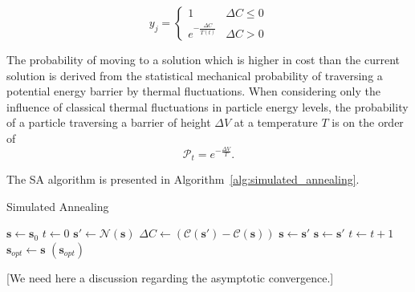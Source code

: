 \documentclass[11pt]{afthesis}
\begin{document}
	\begin{equation} 
	y_j = \begin{cases}
	1 &\Delta C   \leq 0 \\
	e^{-\frac{\Delta C}{T(t)}} & \Delta C > 0 
	\end{cases}
	\end{equation}

	
	The probability of moving to a solution which is higher in cost than the current solution is derived from the statistical mechanical probability of traversing a potential energy barrier by thermal fluctuations. When considering only the influence of classical thermal fluctuations in particle energy levels, the probability of a particle traversing a barrier of height \begin{math} \Delta V \end{math} at a temperature \begin{math} T \end{math} is on the order of \begin{equation} 
	\mathcal{P}_t = e^{-\frac{\Delta V}{T}} .
	\label{eq:thermal_traversal_prob}
	\end{equation}
	
	The SA algorithm is presented in Algorithm~\ref{alg:simulated_annealing}. 



	
	\begin{algorithm}
		\caption{Simulated Annealing}
		\label{alg:simulated_annealing}
		\begin{algorithmic}
			\STATE $\boldsymbol{s} \leftarrow \boldsymbol{s}_0$
			\STATE $t \leftarrow 0$
			\STATE $\boldsymbol{s}' \leftarrow \boldsymbol{\mathcal{N}}(\boldsymbol{s}) $
			\STATE $\Delta C \leftarrow (\mathcal{C}(\boldsymbol{s}')-\mathcal{C}(\boldsymbol{s}))$
			\STATE $\boldsymbol{s} \leftarrow \boldsymbol{s}'$
			\STATE $\boldsymbol{s} \leftarrow \boldsymbol{s}'$
			\ENDIF
			\STATE $t \leftarrow t+1$
			\ENDWHILE
			\STATE $\boldsymbol{s}_{opt} \leftarrow \boldsymbol{s}$
			\RETURN $(\boldsymbol{s}_{opt})$
		\end{algorithmic}
	\end{algorithm}
		
	[We need here a discussion regarding the asymptotic convergence.]
	
\end{document}
